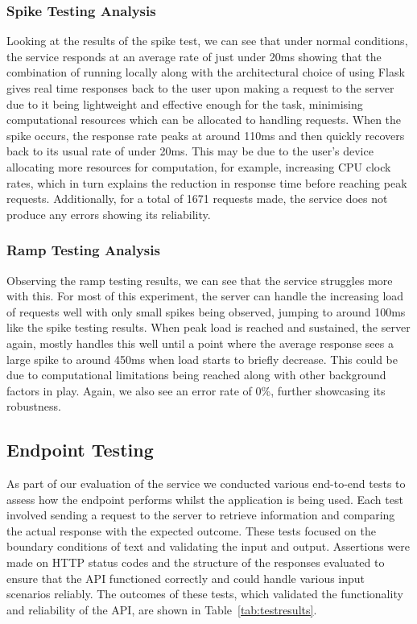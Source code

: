 \documentclass{surreydissertation}
\begin{document}
\subsubsection{Spike Testing Analysis}
Looking at the results of the spike test, we can see that under normal conditions, the service responds at an average rate of just under 20ms showing that the combination of running locally along with the architectural choice of using Flask gives real time responses back to the user upon making a request to the server due to it being lightweight and effective enough for the task, minimising computational resources which can be allocated to handling requests. When the spike occurs, the response rate peaks at around 110ms and then quickly recovers back to its usual rate of under 20ms. This may be due to the user’s device allocating more resources for computation, for example, increasing CPU clock rates, which in turn explains the reduction in response time before reaching peak requests. Additionally, for a total of 1671 requests made, the service does not produce any errors showing its reliability.

\subsubsection{Ramp Testing Analysis}
Observing the ramp testing results, we can see that the service struggles more with this. For most of this experiment, the server can handle the increasing load of requests well with only small spikes being observed, jumping to around 100ms like the spike testing results. When peak load is reached and sustained, the server again, mostly handles this well until a point where the average response sees a large spike to around 450ms when load starts to briefly decrease. This could be due to computational limitations being reached along with other background factors in play. Again, we also see an error rate of 0\%, further showcasing its robustness.

\subsection{Endpoint Testing}
As part of our evaluation of the service we conducted various end-to-end tests to assess how the endpoint performs whilst the application is being used. Each test involved sending a request to the server to retrieve information and comparing the actual response with the expected outcome. These tests focused on the boundary conditions of text and validating the input and output. Assertions were made on HTTP status codes and the structure of the responses evaluated to ensure that the API functioned correctly and could handle various input scenarios reliably. The outcomes of these tests, which validated the functionality and reliability of the API, are shown in Table~\ref{tab:testresults}.
\end{document}
